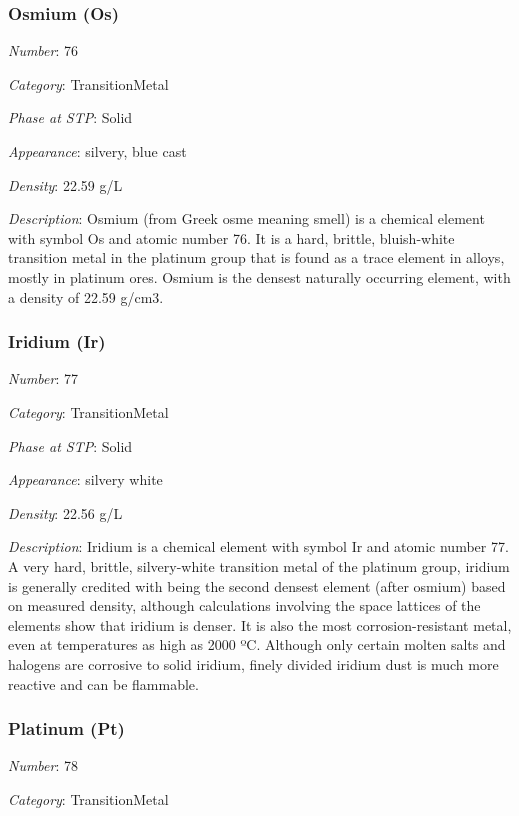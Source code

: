 \documentclass{article}
\begin{document}
\hypertarget{subsubsection::Os}{}\subsubsection{Osmium (Os)}

\textit{Number}: 76

\textit{Category}: TransitionMetal

\textit{Phase at STP}: Solid

\textit{Appearance}: silvery, blue cast

\textit{Density}: 22.59 g/L

\textit{Description}: Osmium (from Greek osme meaning smell) is a chemical element with symbol Os and atomic number 76. It is a hard, brittle, bluish-white transition metal in the platinum group that is found as a trace element in alloys, mostly in platinum ores. Osmium is the densest naturally occurring element, with a density of 22.59 g/cm3.

\hypertarget{subsubsection::Ir}{}\subsubsection{Iridium (Ir)}

\textit{Number}: 77

\textit{Category}: TransitionMetal

\textit{Phase at STP}: Solid

\textit{Appearance}: silvery white

\textit{Density}: 22.56 g/L

\textit{Description}: Iridium is a chemical element with symbol Ir and atomic number 77. A very hard, brittle, silvery-white transition metal of the platinum group, iridium is generally credited with being the second densest element (after osmium) based on measured density, although calculations involving the space lattices of the elements show that iridium is denser. It is also the most corrosion-resistant metal, even at temperatures as high as 2000 ºC. Although only certain molten salts and halogens are corrosive to solid iridium, finely divided iridium dust is much more reactive and can be flammable.

\hypertarget{subsubsection::Pt}{}\subsubsection{Platinum (Pt)}

\textit{Number}: 78

\textit{Category}: TransitionMetal
\end{document}
